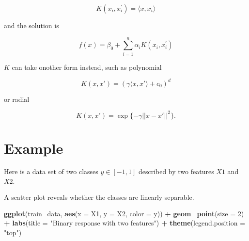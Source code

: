\documentclass[]{book}
\newenvironment{Shaded}{\begin{snugshade}}{\end{snugshade}}
\newcommand{\DataTypeTok}[1]{\textcolor[rgb]{0.13,0.29,0.53}{#1}}
\newcommand{\DecValTok}[1]{\textcolor[rgb]{0.00,0.00,0.81}{#1}}
\newcommand{\KeywordTok}[1]{\textcolor[rgb]{0.13,0.29,0.53}{\textbf{#1}}}
\newcommand{\NormalTok}[1]{#1}
\newcommand{\OperatorTok}[1]{\textcolor[rgb]{0.81,0.36,0.00}{\textbf{#1}}}
\newcommand{\StringTok}[1]{\textcolor[rgb]{0.31,0.60,0.02}{#1}}
\begin{document}
\[K(x_i, x_i^{'}) = \langle x, x_i \rangle\]

and the solution is

\[f(x) = \beta_0 + \sum_{i = 1}^n {\alpha_i K(x_i, x_i^{'})}\]

\(K\) can take onother form instead, such as polynomial

\[K(x, x') = (\gamma \langle x, x' \rangle + c_0)^d\]

or radial

\[K(x, x') = \exp\{-\gamma ||x - x'||^2\}.\]

\hypertarget{example-6}{%
\section{Example}\label{example-6}}

Here is a data set of two classes \(y \in [-1, 1]\) described by two features \(X1\) and \(X2\).

\begin{Shaded}
\end{Shaded}

A scatter plot reveals whether the classes are linearly separable.

\begin{Shaded}
\begin{Highlighting}[]
\KeywordTok{ggplot}\NormalTok{(train_data, }\KeywordTok{aes}\NormalTok{(}\DataTypeTok{x =}\NormalTok{ X1, }\DataTypeTok{y =}\NormalTok{ X2, }\DataTypeTok{color =}\NormalTok{ y)) }\OperatorTok{+}
\StringTok{  }\KeywordTok{geom_point}\NormalTok{(}\DataTypeTok{size =} \DecValTok{2}\NormalTok{) }\OperatorTok{+}
\StringTok{  }\KeywordTok{labs}\NormalTok{(}\DataTypeTok{title =} \StringTok{"Binary response with two features"}\NormalTok{) }\OperatorTok{+}
\StringTok{  }\KeywordTok{theme}\NormalTok{(}\DataTypeTok{legend.position =} \StringTok{"top"}\NormalTok{)}
\end{Highlighting}
\end{Shaded}
\end{document}

